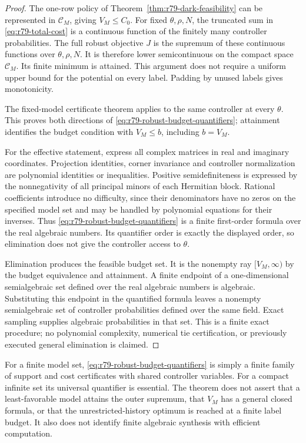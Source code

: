 \begin{proof}
The one-row policy of Theorem~\ref{thm:r79-dark-feasibility} can be
represented in $\mathcal C_M$, giving $V_M\le C_0$.
For fixed $\theta,\rho,N$, the truncated sum in
\eqref{eq:r79-total-cost} is a continuous function of the finitely
many controller probabilities.  The full robust objective $J$ is
the supremum of these continuous functions over $\theta,\rho,N$.
It is therefore lower semicontinuous on the compact space
$\mathcal C_M$.  Its finite minimum is attained.  This argument
does not require a uniform upper bound for the potential on every
label.  Padding by unused labels gives monotonicity.

The fixed-model certificate theorem applies to the same controller
at every $\theta$.  This proves both directions of
\eqref{eq:r79-robust-budget-quantifiers}; attainment identifies the
budget condition with $V_M\le b$, including $b=V_M$.

For the effective statement, express all complex matrices in real
and imaginary coordinates.  Projection identities, corner
invariance and controller normalization are polynomial identities
or inequalities.  Positive semidefiniteness is expressed by the
nonnegativity of all principal minors of each Hermitian block.
Rational coefficients introduce no difficulty, since their
denominators have no zeros on the specified model set and may be
handled by polynomial equations for their inverses.  Thus
\eqref{eq:r79-robust-budget-quantifiers} is a finite first-order
formula over the real algebraic numbers.  Its quantifier order is
exactly the displayed order, so elimination does not give the
controller access to $\theta$.

Elimination produces the feasible budget set.  It is the nonempty
ray $[V_M,\infty)$ by the budget equivalence and attainment.  A
finite endpoint of a one-dimensional semialgebraic set defined over
the real algebraic numbers is algebraic.  Substituting this endpoint
in the quantified formula leaves a nonempty semialgebraic set of
controller probabilities defined over the same field.  Exact
sampling supplies algebraic probabilities in that set.  This is
a finite exact procedure; no polynomial complexity, numerical tie
certification, or previously executed general elimination is claimed.
\end{proof}

For a finite model set, \eqref{eq:r79-robust-budget-quantifiers} is
simply a finite family of support and cost certificates with shared
controller variables.  For a compact infinite set its universal
quantifier is essential.  The theorem does not assert that a
least-favorable model attains the outer supremum, that $V_M$ has a
general closed formula, or that the unrestricted-history optimum
is reached at a finite label budget.  It also does not identify
finite algebraic synthesis with efficient computation.

